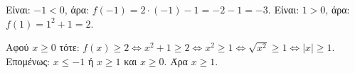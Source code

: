 
\begin{alist}
\item Είναι: $-1 < 0$, άρα: $f(-1) = 2 \cdot (-1) - 1 = -2 - 1 = -3$.
Είναι: $1 > 0$, άρα: $f(1) = 1^2 + 1 = 2$.

\item Αφού $x \ge 0$ τότε: $f(x) \ge 2 \Leftrightarrow x^2 + 1 \ge 2 \Leftrightarrow x^2 \ge 1 \Leftrightarrow \sqrt{x^2} \ge 1 \Leftrightarrow |x| \ge 1$.
Επομένως: $x \le -1$ ή $x \ge 1$ και $x \ge 0$.
Άρα $x \ge 1$.
\end{alist}

